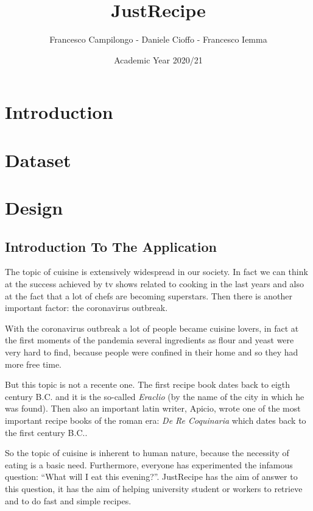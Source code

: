 \documentclass[a4paper]{report}
\begin{document}
\title{\Huge{JustRecipe}}
\author{\Large{Francesco Campilongo - Daniele Cioffo - Francesco Iemma}}
\date{Academic Year 2020/21}
\maketitle
\tableofcontents

\chapter*{Introduction}

\chapter{Dataset}


\chapter{Design}
\section{Introduction To The Application}
The topic of cuisine is extensively widespread in our society. In fact we can think at the success achieved by tv shows related to cooking in the last years and also at the fact that a lot of chefs are becoming superstars.
Then there is another important factor: the coronavirus outbreak.

\noindent With the coronavirus outbreak a lot of people became cuisine lovers, in fact at the first moments of the pandemia several ingredients as flour and yeast were very hard to find, because people were confined in their home and so they had more free time.

\noindent But this topic is not a recente one. The first recipe book dates back to eigth century B.C. and it is the so-called \emph{Eraclio} (by the name of the city in which he was found). Then also an important latin writer, Apicio, wrote one of the most important recipe books of the roman era: \emph{De Re Coquinaria} which dates back to the first century B.C..
 
\noindent So the topic of cuisine is inherent to human nature, because the necessity of eating is a basic need.
Furthermore, everyone has experimented the infamous question: “What will I eat this evening?”. JustRecipe has the aim of answer to this question, it has the aim of helping university student or workers to retrieve and to do fast and simple recipes.
\end{document}
